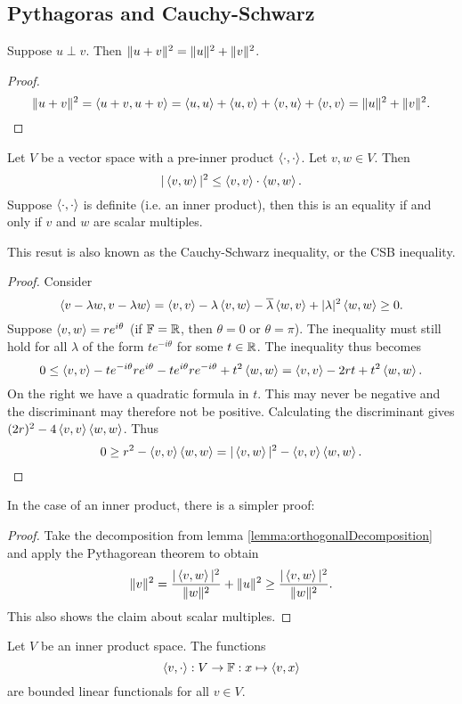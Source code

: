 \subsection{Pythagoras and Cauchy-Schwarz}
\begin{theorem}
Suppose $u\perp v$. Then $\lVert u+v\rVert^2 = \lVert u\rVert^2 + \lVert v\rVert^2$.
\end{theorem}
\begin{proof}
\[ \lVert u+v\rVert^2 = \left\langle u+v,u+v \right\rangle = \left\langle u,u \right\rangle+ \left\langle u,v \right\rangle + \left\langle v,u \right\rangle + \left\langle v,v \right\rangle = \lVert u\rVert^2 + \lVert v\rVert^2. \]
\end{proof}

\begin{theorem} \label{theorem:CauchySchwarz}
Let $V$ be a vector space with a pre-inner product $\left\langle \cdot,\cdot \right\rangle$. Let $v,w\in V$. Then
\[ |\left\langle v,w \right\rangle|^2\leq \left\langle v,v \right\rangle\cdot\left\langle w,w \right\rangle. \]
Suppose $\left\langle \cdot,\cdot \right\rangle$ is definite (i.e. an inner product), then
this is an equality \textup{if and only if} $v$ and $w$ are scalar multiples.
\end{theorem}
This resut is also known as the Cauchy-Schwarz inequality, or the CSB inequality.
\begin{proof}
Consider 
\[ \left\langle v-\lambda w, v-\lambda w \right\rangle = \left\langle v,v \right\rangle-\lambda\left\langle v,w \right\rangle-\overline{\lambda}\left\langle w,v \right\rangle + |\lambda|^2 \left\langle w,w \right\rangle \geq 0. \]
Suppose $\left\langle v,w \right\rangle=re^{i\theta}$ (if $\mathbb{F} = \mathbb{R}$, then $\theta=0$ or $\theta = \pi$). The inequality must still hold for all $\lambda$ of the form $te^{-i\theta}$ for some $t\in \mathbb{R}$. The inequality thus becomes
\[ 0\leq \left\langle v,v \right\rangle-te^{-i\theta}re^{i\theta}-te^{i\theta}re^{-i\theta} + t^2 \left\langle w,w \right\rangle = \left\langle v,v \right\rangle-2rt + t^2 \left\langle w,w \right\rangle. \]
On the right we have a quadratic formula in $t$. This may never be negative and the discriminant may therefore not be positive. Calculating the discriminant gives $(2r)^2 - 4\left\langle v,v \right\rangle\left\langle w,w \right\rangle$. Thus
\[ 0\geq r^2 - \left\langle v,v \right\rangle\left\langle w,w \right\rangle = |\left\langle v,w \right\rangle|^2 - \left\langle v,v \right\rangle\left\langle w,w \right\rangle. \]
\end{proof}
In the case of an inner product, there is a simpler proof:
\begin{proof}
Take the decomposition from lemma \ref{lemma:orthogonalDecomposition} and apply the Pythagorean theorem to obtain
\[ \lVert v\rVert^2 = \frac{|\left\langle v,w \right\rangle|^2}{\lVert w\rVert^2} + \lVert u\rVert^2 \geq \frac{|\left\langle v,w \right\rangle|^2}{\lVert w\rVert^2}. \]
This also shows the claim about scalar multiples.
\end{proof}
\begin{corollary} \label{lemma:innerBoundedFunctionals}
Let $V$ be an inner product space. The functions
\[\left\langle v,\cdot \right\rangle: V\to \mathbb{F}: x\mapsto \left\langle v,x \right\rangle \]
are bounded linear functionals for all $v\in V$.
\end{corollary}

